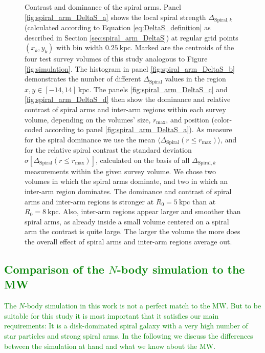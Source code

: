 \documentclass[iop,revtex4,numberedappendix,appendixfloats]{emulateapj}
\newcommand{\NEW}[1]{\textcolor{Green}{#1}}
\newcommand{\hiddenComment}[1]{}
\begin{document}
\begin{figure}[!htbp]
\caption{Contrast and dominance of the spiral arms. Panel \ref{fig:spiral_arm_DeltaS_a} shows the local spiral strength $\Delta_{\text{Spiral},k}$ (calculated according to Equation \eqref{eq:DeltaS_definition} as described in Section \ref{sec:spiral_arm_DeltaS}) at regular grid points $(x_k,y_k)$ with bin width $0.25~\text{kpc}$. Marked are the centroids of the four test survey volumes of this study analogous to Figure \ref{fig:simulation}. The histogram in panel \ref{fig:spiral_arm_DeltaS_b} demonstrates the number of different $\Delta_\text{Spiral}$ values in the region $x,y \in [-14,14]~\text{kpc}$. The panels \ref{fig:spiral_arm_DeltaS_c} and \ref{fig:spiral_arm_DeltaS_d} then show the dominance and relative  contrast of spiral arms and inter-arm regions within each survey volume, depending on the volumes' size, $r_\text{max}$, and position (color-coded according to panel \ref{fig:spiral_arm_DeltaS_a}). As measure for the spiral dominance we use the mean $\langle \Delta_\text{Spiral} (r \leq r_\text{max}) \rangle$, and for the relative spiral contrast the standard deviation $\sigma[\Delta_\text{Spiral} (r \leq r_\text{max})]$, calculated on the basis of all $\Delta_{\text{Spiral},k}$ measurements within the given survey volume. We chose two volumes in which the spiral arms dominate, and two in which an inter-arm region dominates. The dominance and contrast of spiral arms and inter-arm regions is stronger at $R_0=5~\text{kpc}$ than at $R_0=8~\text{kpc}$. Also, inter-arm regions appear larger and smoother than spiral arms, as already inside a small volume centered on a spiral arm the contrast is quite large. The larger the volume the more does the overall effect of spiral arms and inter-arm regions average out. \hiddenComment{[TO DO: Jo suggested to look into implementing a $\text{sech}^2$ disk for galpy to not have the slight bias in mean($\kappa$) at higher rmax. Maybe it's easy to implement. Maybe it isn't. Reference for sech(z) disk: \url{http://adsabs.harvard.edu/abs/1989MNRAS.239..571K}]}}
\label{fig:spiral_arm_DeltaS}
\end{figure}

\subsection{\NEW{Comparison of the $N$-body simulation to the MW}}

\NEW{The $N$-body simulation in this work is not a perfect match to the MW. But to be suitable for this study it is most important that it satisfies our main requirements:  It is a disk-dominated spiral galaxy with a very high number of star particles and strong spiral arms. In the following we discuss the differences between the simulation at hand and what we know about the MW.}
\end{document}
